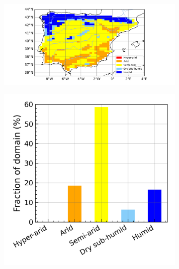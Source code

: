 \begin{figure}[htbp]
    \centering
    \begin{subfigure}[b]{0.67\textwidth}
        \caption{}
        \includegraphics[width=\textwidth]{images/chap4/future/aridity_index_pres_noirr.png}
    \end{subfigure}
    \begin{subfigure}[b]{0.31\textwidth}
        \caption{}
        \includegraphics[width=\textwidth]{images/chap4/future/aridity_index_distribution_pres_noirr.png}
    \end{subfigure} \\


\end{figure}
